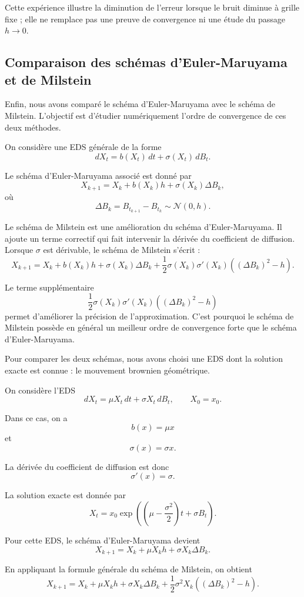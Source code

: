 \documentclass[12pt,a4paper]{article}
\theoremstyle{remark}
\begin{document}
Cette expérience illustre la diminution de l'erreur lorsque le bruit diminue à grille fixe ; elle ne remplace pas une preuve de convergence ni une étude du passage $h\to0$.

\subsection{Comparaison des schémas d’Euler-Maruyama et de Milstein}

Enfin, nous avons comparé le schéma d’Euler-Maruyama avec le schéma de Milstein. L’objectif est d’étudier numériquement l’ordre de convergence de ces deux méthodes.

On considère une EDS générale de la forme
\[
dX_t = b(X_t)\,dt + \sigma(X_t)\,dB_t.
\]

Le schéma d’Euler-Maruyama associé est donné par
\[
X_{k+1}
=
X_k
+
b(X_k)h
+
\sigma(X_k)\Delta B_k,
\]
où
\[
\Delta B_k = B_{t_{k+1}}-B_{t_k}
\sim \mathcal{N}(0,h).
\]

Le schéma de Milstein est une amélioration du schéma d’Euler-Maruyama. Il ajoute un terme correctif qui fait intervenir la dérivée du coefficient de diffusion. Lorsque $\sigma$ est dérivable, le schéma de Milstein s’écrit :
\[
X_{k+1}
=
X_k
+
b(X_k)h
+
\sigma(X_k)\Delta B_k
+
\frac{1}{2}\sigma(X_k)\sigma'(X_k)
\left((\Delta B_k)^2-h\right).
\]

Le terme supplémentaire
\[
\frac{1}{2}\sigma(X_k)\sigma'(X_k)
\left((\Delta B_k)^2-h\right)
\]
permet d’améliorer la précision de l’approximation. C’est pourquoi le schéma de Milstein possède en général un meilleur ordre de convergence forte que le schéma d’Euler-Maruyama.

Pour comparer les deux schémas, nous avons choisi une EDS dont la solution exacte est connue : le mouvement brownien géométrique.

On considère l’EDS
\[
dX_t = \mu X_t\,dt + \sigma X_t\,dB_t,
\qquad X_0=x_0.
\]

Dans ce cas, on a
\[
b(x)=\mu x
\]
et
\[
\sigma(x)=\sigma x.
\]

La dérivée du coefficient de diffusion est donc
\[
\sigma'(x)=\sigma.
\]

La solution exacte est donnée par
\[
X_t
=
x_0
\exp\left(
\left(\mu-\frac{\sigma^2}{2}\right)t+\sigma B_t
\right).
\]

Pour cette EDS, le schéma d’Euler-Maruyama devient
\[
X_{k+1}
=
X_k
+
\mu X_k h
+
\sigma X_k \Delta B_k.
\]

En appliquant la formule générale du schéma de Milstein, on obtient
\[
X_{k+1}
=
X_k
+
\mu X_k h
+
\sigma X_k \Delta B_k
+
\frac{1}{2}\sigma^2X_k\left((\Delta B_k)^2-h\right).
\]
\end{document}
